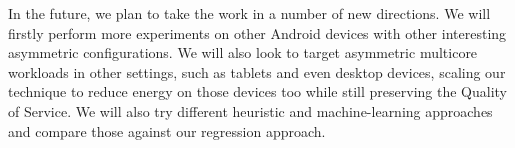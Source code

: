 \documentclass[conference]{IEEEtran}
\begin{document}
In the future, we plan to take the work in a number of new directions. We will firstly perform more experiments on other Android devices with other interesting asymmetric configurations. We will also look to target asymmetric multicore workloads in other settings, such as tablets and even desktop devices, scaling our technique to reduce energy on those devices too while still preserving the Quality of Service. We will also try different heuristic and machine-learning approaches and compare those against our regression approach.



\end{document}
